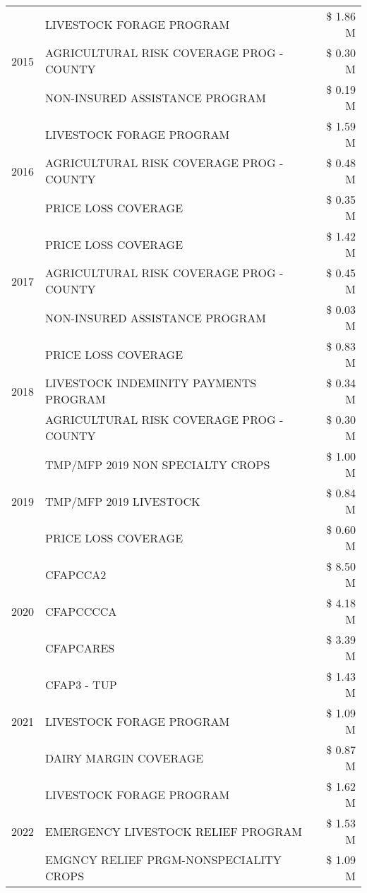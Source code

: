 \begin{tabular}{llr}
\cline{1-3}
\multirow[t]{3}{*}{2015} & LIVESTOCK FORAGE PROGRAM & \$ 1.86 M \\
 & AGRICULTURAL RISK COVERAGE PROG - COUNTY & \$ 0.30 M \\
 & NON-INSURED ASSISTANCE PROGRAM & \$ 0.19 M \\
\cline{1-3}
\multirow[t]{3}{*}{2016} & LIVESTOCK FORAGE PROGRAM & \$ 1.59 M \\
 & AGRICULTURAL RISK COVERAGE PROG - COUNTY & \$ 0.48 M \\
 & PRICE LOSS COVERAGE & \$ 0.35 M \\
\cline{1-3}
\multirow[t]{3}{*}{2017} & PRICE LOSS COVERAGE & \$ 1.42 M \\
 & AGRICULTURAL RISK COVERAGE PROG - COUNTY & \$ 0.45 M \\
 & NON-INSURED ASSISTANCE PROGRAM & \$ 0.03 M \\
\cline{1-3}
\multirow[t]{3}{*}{2018} & PRICE LOSS COVERAGE & \$ 0.83 M \\
 & LIVESTOCK INDEMINITY PAYMENTS PROGRAM & \$ 0.34 M \\
 & AGRICULTURAL RISK COVERAGE PROG - COUNTY & \$ 0.30 M \\
\cline{1-3}
\multirow[t]{3}{*}{2019} & TMP/MFP 2019 NON SPECIALTY CROPS & \$ 1.00 M \\
 & TMP/MFP 2019 LIVESTOCK & \$ 0.84 M \\
 & PRICE LOSS COVERAGE & \$ 0.60 M \\
\cline{1-3}
\multirow[t]{3}{*}{2020} & CFAPCCA2 & \$ 8.50 M \\
 & CFAPCCCCA & \$ 4.18 M \\
 & CFAPCARES & \$ 3.39 M \\
\cline{1-3}
\multirow[t]{3}{*}{2021} & CFAP3 - TUP & \$ 1.43 M \\
 & LIVESTOCK FORAGE PROGRAM & \$ 1.09 M \\
 & DAIRY MARGIN COVERAGE & \$ 0.87 M \\
\cline{1-3}
\multirow[t]{3}{*}{2022} & LIVESTOCK FORAGE PROGRAM & \$ 1.62 M \\
 & EMERGENCY LIVESTOCK RELIEF PROGRAM & \$ 1.53 M \\
 & EMGNCY RELIEF PRGM-NONSPECIALITY CROPS & \$ 1.09 M \\
\cline{1-3}
\bottomrule
\end{tabular}
